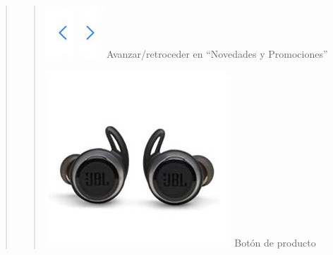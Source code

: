 \documentclass[14pt]{article}
\begin{document}
\begin{quote}
\begin{quote}
                            \includegraphics[height=0.02\textwidth]{BotonAnterior.jpg} \includegraphics[height=0.02\textwidth]{BotonSiguiente.jpg}
                            \label{P4:BotonAnterior/Siguiente} Avanzar/retroceder en “Novedades y Promociones”
                            
                             \includegraphics[height=0.02\textwidth]{BotonDeProducto.jpg}
                            \label{P4:BotonDeProducto} Botón de producto
                    \end{quote}
                \end{quote}
            
            \newpage
\end{document}
